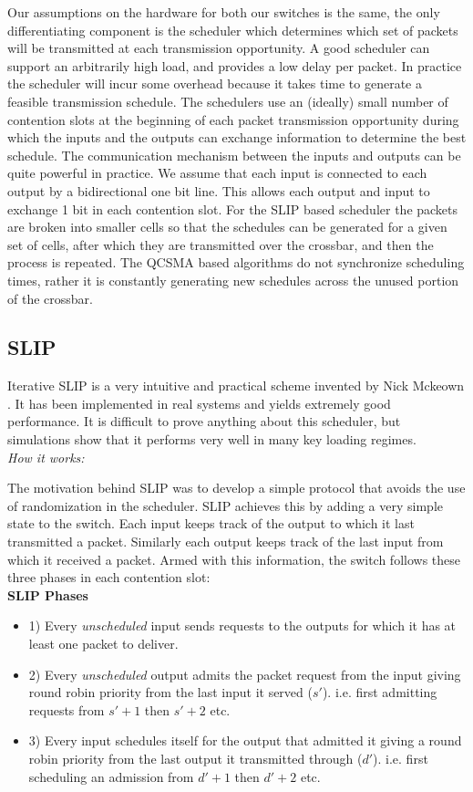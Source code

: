 \documentclass[11pt]{article}%
\begin{document}
Our assumptions on the hardware for both our switches is the same, the only differentiating component is the scheduler which determines which set of packets will be transmitted at each transmission opportunity.  A good scheduler can support an arbitrarily high load, and provides a low delay per packet.  In practice the scheduler will incur some overhead because it takes time to generate a feasible transmission schedule.  The schedulers use an (ideally) small number of contention slots at the beginning of each packet transmission opportunity during which the inputs and the outputs can exchange information to determine the best schedule.  The communication mechanism between the inputs and outputs can be quite powerful in practice.  We assume that each input is connected to each output by a bidirectional one bit line. This allows each output and input to exchange 1 bit in each contention slot.  For the SLIP based scheduler the packets are broken into smaller cells so that the schedules can be generated for a given set of cells, after which they are transmitted over the crossbar, and then the process is repeated.  The QCSMA based algorithms do not synchronize scheduling times, rather it is constantly generating new schedules across the unused portion of the crossbar.

\subsection{SLIP}

Iterative SLIP is a very intuitive and practical scheme invented by Nick Mckeown \cite{McKeown}.  It has been implemented in real systems and yields extremely good performance.  It is difficult to prove anything about this scheduler, but simulations show that it performs very well in many key loading regimes.\\

{\it How it works:}

The motivation behind SLIP was to develop a simple protocol that avoids the use of randomization in the scheduler.  SLIP achieves this by adding a very simple state to the switch.  Each input keeps track of the output to which it last transmitted a packet.  Similarly each output keeps track of the last input from which it received a packet.  Armed with this information, the switch follows these three phases in each contention slot:\\

{\bf SLIP Phases}
\begin{itemize}
\item 1) Every {\it unscheduled} input sends requests to the outputs for which it has at least one packet to deliver.
\item 2) Every {\it unscheduled} output admits the packet request from the input giving round robin priority from the last input it served ($s'$). i.e. first admitting requests from $s'+1$ then $s'+2$ etc.
\item 3) Every input schedules itself for the output that admitted it giving a round robin priority from the last output it transmitted through ($d'$).  i.e. first scheduling an admission from $d'+1$ then $d'+2$ etc.\\
\end{itemize}
\end{document}
